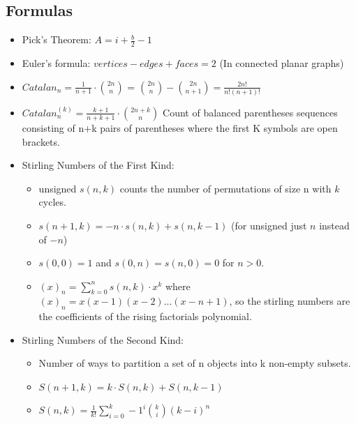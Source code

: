 	\subsection{Formulas}
		\begin{itemize}
		    \item Pick's Theorem: $A = i + \frac{b}{2} - 1$
		    \item Euler's formula: $vertices - edges + faces = 2$ (In connected planar graphs)
		    \item $Catalan_n = \frac{1}{n+1} \cdot \binom{2n}{n}$ = $\binom{2n}{n} - \binom{2n}{n+1} = \frac{2n!}{n!(n+1)!}$
		    \item $Catalan_n^{(k)} = \frac{k+1}{n+k+1} \cdot \binom{2n+k}{n}$ Count of balanced parentheses sequences consisting of n+k
                   pairs of parentheses where the first K
                   symbols are open brackets.
            \item Stirling Numbers of the First Kind:
                 \begin{itemize}
                    \item unsigned $s(n, k)$ counts the number of permutations of size n with $k$ cycles.
                    \item $s(n+1, k) = -n \cdot s(n, k) + s(n, k - 1)$ (for unsigned just $n$ instead of $-n$)
                    \item $s(0, 0) = 1$ and $s(0, n) = s(n, 0) = 0$ for $n > 0$.
                    \item $(x)_n = \sum\limits_{k=0}^n{s(n, k)\cdot{x^k}}$ where $(x)_n = x(x-1)(x-2)...(x-n+1)$, so the stirling numbers are the coefficients of the rising factorials polynomial.
                \end{itemize}
           \item Stirling Numbers of the Second Kind:
                 \begin{itemize}
                     \item Number of ways to partition a set of n objects into k non-empty subsets.
                     \item $S(n+1, k) = k\cdot{S(n, k)}+S(n, k-1)$
                     \item $S(n, k) = \frac{1}{k!} \sum\limits_{i=0}^k -1^i \binom{k}{i} (k-i)^n$
                 \end{itemize}
		\end{itemize}
